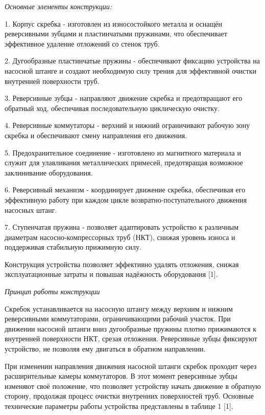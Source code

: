 \begin{multicols}{2}
\emph{Основные элементы конструкции:}

1. Корпус скребка - изготовлен из износостойкого металла и оснащён
реверсивными зубцами и пластинчатыми пружинами, что обеспечивает
эффективное удаление отложений со стенок труб.

2. Дугообразные пластинчатые пружины - обеспечивают фиксацию устройства
на насосной штанге и создают необходимую силу трения для эффективной
очистки внутренней поверхности труб.

3. Реверсивные зубцы - направляют движение скребка и предотвращают его
обратный ход, обеспечивая последовательную циклическую очистку.

4. Реверсивные коммутаторы - верхний и нижний ограничивают рабочую зону
скребка и обеспечивают смену направления его движения.

5. Предохранительное соединение - изготовлено из магнитного материала и
служит для улавливания металлических примесей, предотвращая возможное
заклинивание оборудования.

6. Реверсивный механизм - координирует движение скребка, обеспечивая его
эффективную работу при каждом цикле возвратно-поступательного движения
насосных штанг.

7. Ступенчатая пружина - позволяет адаптировать устройство к различным
диаметрам насосно-компрессорных труб (НКТ), снижая уровень износа и
поддерживая стабильную прижимную силу.

Конструкция устройства позволяет эффективно удалять отложения, снижая
эксплуатационные затраты и повышая надёжность оборудования {[}1{]}.

\emph{Принцип работы конструкции}

Скребок устанавливается на насосную штангу между верхним и нижним
реверсивными коммутаторами, ограничивающими рабочий участок. При
движении насосной штанги вниз дугообразные пружины плотно прижимаются к
внутренней поверхности НКТ, срезая отложения. Реверсивные зубцы
фиксируют устройство, не позволяя ему двигаться в обратном направлении.

При изменении направления движения насосной штанги скребок проходит
через расширительные камеры коммутаторов. В этот момент реверсивные
зубцы изменяют своё положение, что позволяет устройству начать движение
в обратную сторону, продолжая процесс очистки внутренних поверхностей
труб. Основные технические параметры работы устройства представлены в
таблице 1 {[}1{]}.
\end{multicols}

